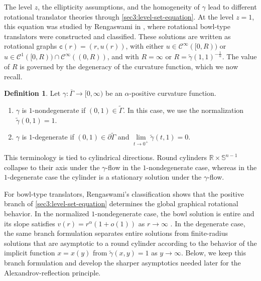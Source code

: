 \documentclass{amsart}
\theoremstyle{plain}
\theoremstyle{mainintrothm}
\theoremstyle{definition}
\newtheorem{definition}[theorem]{Definition}
\begin{document}
The level $z$, the ellipticity assumptions, and the homogeneity of $\gamma$
lead to different rotational translator theories through
\eqref{sec3:level-set-equation}.  At the level $z=1$, this equation was studied
by Rengaswami in \cite{rengaswami2024classification}, where rotational
bowl-type translators were constructed and classified.  These solutions are
written as rotational graphs $\mathtt c(r)=(r,u(r))$, with either
$u\in\mathcal C^\infty([0,R))$ or
$u\in\mathcal C^1([0,R))\cap\mathcal C^\infty((0,R))$, and with
$R=\infty$ or $R=\widetilde\gamma(1,1)^{-\frac{1}{\alpha}}$.  The value of $R$
is governed by the degeneracy of the curvature function, which we now recall.

\begin{definition}
	\label{def:one-nondegenerate-and-degenerate}
	Let $\gamma:\overline\Gamma\to[0,\infty)$ be an $\alpha$-positive
	curvature function.
	\begin{enumerate}[label=\textup{(\roman*)}]
		\item $\gamma$ is $1$-nondegenerate if $(0,1)\in\widetilde\Gamma$.  In
		this case, we use the normalization $\widetilde\gamma(0,1)=1$.

		\item $\gamma$ is $1$-degenerate if $(0,1)\in\partial\widetilde\Gamma$
		and $\lim\limits_{t\to0^+}\widetilde\gamma(t,1)=0$.
	\end{enumerate}
\end{definition}

This terminology is tied to cylindrical directions. Round cylinders
$\mathbb R\times\mathbb S^{n-1}$ collapse to their axis under the
$\gamma$-flow in the $1$-nondegenerate case, whereas in the $1$-degenerate case
the cylinder is a stationary solution under the $\gamma$-flow.

\medskip

For bowl-type translators, Rengaswami's classification shows that the positive
branch of \eqref{sec3:level-set-equation} determines the global graphical rotational
behavior.  In the normalized $1$-nondegenerate case, the bowl solution is entire and its slope satisfies
$v(r)=r^\alpha(1+o(1))$ as $r\to\infty$
\cite{rengaswami2024classification}.  In the degenerate case, the same branch
formulation separates entire solutions from finite-radius solutions that are asymptotic to a round cylinder according to the behavior of the implicit function $x=x(y)$ from $\widetilde\gamma(x,y)=1$ as $y\to\infty$.  Below, we keep this branch
formulation and develop the sharper asymptotics needed later for the
Alexandrov-reflection principle.
\end{document}
